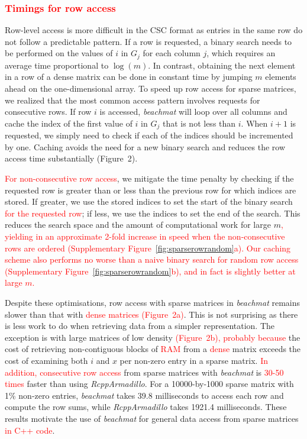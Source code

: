 \documentclass{article}
\newcommand{\beachmat}{\textit{beachmat}}
\newcommand{\revised}[1]{\textcolor{red}{#1}}
\begin{document}
\subsubsection{\revised{Timings for row access}}
Row-level access is more difficult in the CSC format as entries in the same row do not follow a predictable pattern.
If a row is requested, a binary search needs to be performed on the values of $i$ in $G_j$ for each column $j$, which requires an average time proportional to $\log(m)$.
In contrast, obtaining the next element in a row of a dense matrix can be done in constant time by jumping $m$ elements ahead on the one-dimensional array.
To speed up row access for sparse matrices, we realized that the most common access pattern involves requests for consecutive rows.
If row $i$ is accessed, \beachmat{} will loop over all columns and cache the index of the first value of $i$ in $G_j$ that is not less than $i$.
When $i+1$ is requested, we simply need to check if each of the indices should be incremented by one.
Caching avoids the need for a new binary search and reduces the row access time substantially (Figure~2).


\revised{For non-consecutive row access}, we mitigate the time penalty by checking if the requested row is greater than or less than the previous row for which indices are stored.
If greater, we use the stored indices to set the start of the binary search \revised{for the requested row}; if less, we use the indices to set the end of the search. 
This reduces the search space and the amount of computational work for large $m$\revised{, yielding in an approximate 2-fold increase in speed when the non-consecutive rows are ordered (Supplementary Figure~\ref{fig:sparserowrandom}a).
Our caching scheme also performs no worse than a naive binary search for random row access (Supplementary Figure~\ref{fig:sparserowrandom}b), and in fact is slightly better at large $m$.}

Despite these optimisations, row access with sparse matrices in \beachmat{} remains slower than that with \revised{dense matrices (Figure~2a)}.
This is not surprising as there is less work to do when retrieving data from a simpler representation.
The exception is with large matrices of low density \revised{(Figure~2b), probably because} the cost of retrieving non-contiguous blocks of \revised{RAM} from a \revised{dense} matrix exceeds the cost of examining both $i$ and $x$ per non-zero entry in a sparse matrix.
\revised{In addition, consecutive row access} from sparse matrices with \beachmat{} is \revised{30-50 times} faster than using \textit{RcppArmadillo}.
For a 10000-by-1000 sparse matrix with 1\% non-zero entries, \beachmat{} takes 39.8 milliseconds to access each row and compute the row sums, while \textit{RcppArmadillo} takes 1921.4 milliseconds.
These results motivate the use of \beachmat{} for general data access from sparse matrices \revised{in C++ code}.
\end{document}
